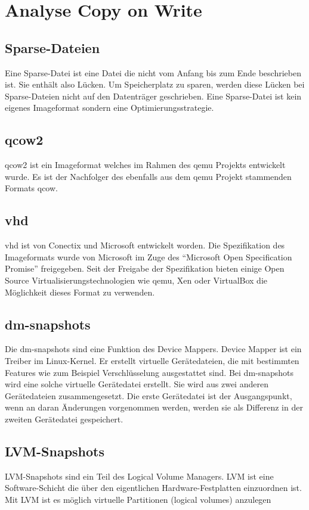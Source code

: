 \chapter{Analyse Copy on Write}
\section{Sparse-Dateien}
Eine Sparse-Datei ist eine Datei die nicht vom Anfang bis zum Ende beschrieben ist. Sie enthält also Lücken. Um Speicherplatz zu sparen, werden diese Lücken bei Sparse-Dateien nicht auf den Datenträger geschrieben. Eine Sparse-Datei ist kein eigenes Imageformat sondern eine Optimierungsstrategie. \cite{sparse}
\section{qcow2}
qcow2 ist ein Imageformat welches im Rahmen des qemu Projekts entwickelt wurde. Es ist der Nachfolger des ebenfalls aus dem qemu Projekt stammenden Formats qcow. \cite{qcowmarkmc} \cite{qemuwiki}
\section{vhd}
vhd ist von Conectix und Microsoft entwickelt worden. Die Spezifikation des Imageformats wurde von Microsoft im Zuge des ``Microsoft Open Specification Promise'' freigegeben. Seit der Freigabe der Spezifikation bieten einige Open Source Virtualisierungstechnologien wie qemu, Xen oder VirtualBox die Möglichkeit dieses Format zu verwenden. \cite{msosp} \cite{vhdspec}
\section{dm-snapshots}
Die dm-snapshots sind eine Funktion des Device Mappers. Device Mapper ist ein Treiber im Linux-Kernel. Er erstellt virtuelle Gerätedateien, die mit bestimmten Features wie zum Beispiel Verschlüsselung ausgestattet sind. Bei dm-snapshots wird eine solche virtuelle Gerätedatei erstellt. Sie wird aus zwei anderen Gerätedateien zusammengesetzt. Die erste Gerätedatei ist der Ausgangspunkt, wenn an daran Änderungen vorgenommen werden, werden sie als Differenz in der zweiten Gerätedatei gespeichert. \cite{dmmbroz} \cite{dmkerneldoc}
\section{LVM-Snapshots}
LVM-Snapshots sind ein Teil des Logical Volume Managers. LVM ist eine Software-Schicht die über den eigentlichen Hardware-Festplatten einzuordnen ist. Mit LVM ist es möglich virtuelle Partitionen (logical volumes) anzulegen